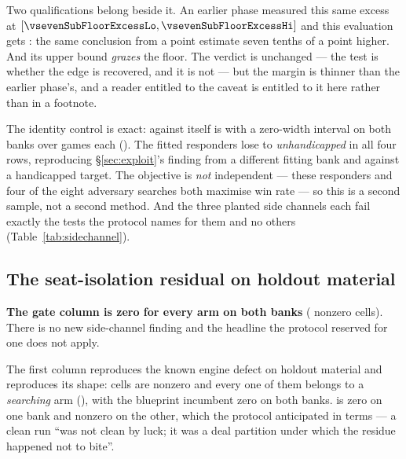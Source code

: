 Two qualifications belong beside it. An earlier phase measured this same excess at \vsevenSubFloorExcess{}
$[\vsevenSubFloorExcessLo, \vsevenSubFloorExcessHi]$ and this evaluation gets
\vsevenBnineHfiveExcess{}: the same conclusion from a point
estimate seven tenths of a point higher. And its upper bound \emph{grazes} the floor. The verdict is
unchanged --- the test is whether the edge is recovered, and it is not --- but the margin is thinner
than the earlier phase's, and a reader entitled to the caveat is entitled to it here rather than in a
footnote.

The identity control is exact: \frozen{} against itself is \vsevenIdentityRate{} with a zero-width
interval on both banks over \vsevenIdentityN{} games each (\vsevenIdentityExact{}). The fitted responders lose to \emph{unhandicapped} \frozen{} in all four rows, reproducing
\S\ref{sec:exploit}'s finding from a different fitting bank and against a handicapped target. The
objective is \emph{not} independent --- these responders and four of the eight adversary searches
both maximise win rate --- so this is a second sample, not a second method. And the three planted side channels each fail exactly the
tests the protocol names for them and no others (Table~\ref{tab:sidechannel}).

\subsection{The seat-isolation residual on holdout material}
\label{sec:results-residual}

\begin{table}[t]\centering
\caption{The seat-isolation residual, \vsevenSsixCells{} cells over \vsevenSsixDeals{} audited deals.
The gate column is the preregistered zero-tolerance condition; the first column is the shipped mode.}
\label{tab:residual}
{\small}
\end{table}

\textbf{The gate column is zero for every arm on both banks} (\vsevenSsixGateNonzero{} nonzero cells).
There is no new side-channel finding and the headline the protocol reserved for one does not apply.

The first column reproduces the known engine defect on holdout material and reproduces its shape:
\vsevenSsixPlainNonzero{} cells are nonzero and every one of them belongs to a \emph{searching} arm
(\vsevenSsixAllSearching{}), with the blueprint incumbent zero on both banks. \frozen{} is zero on one
bank and nonzero on the other, which the protocol anticipated in terms --- a clean run ``was not clean
by luck; it was a deal partition under which the residue happened not to bite''.

